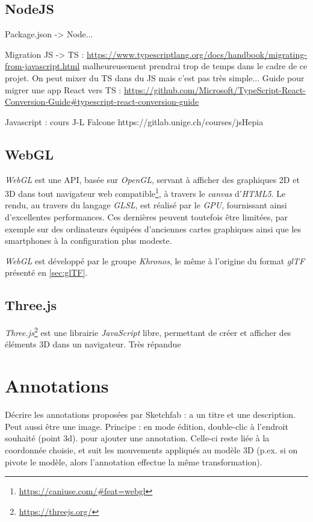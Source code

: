 \subsection{NodeJS}
Package.json -> Node...

Migration JS -> TS : \url{https://www.typescriptlang.org/docs/handbook/migrating-from-javascript.html}
malheureusement prendrai trop de temps dans le cadre de ce projet. On peut mixer du TS dans du JS mais c'est pas très simple...
Guide pour migrer une app React vers TS : \url{https://github.com/Microsoft/TypeScript-React-Conversion-Guide\#typescript-react-conversion-guide}

Javascript : cours J-L Falcone https://gitlab.unige.ch/courses/jsHepia

\subsection{WebGL}
\textit{WebGL} est une API, basée sur \textit{OpenGL}, servant à afficher des graphiques 2D et 3D dans tout navigateur web compatible\footnote{\url{https://caniuse.com/\#feat=webgl}}, à travers le \textit{canvas} d'\textit{HTML5}. 
Le rendu, au travers du langage \textit{GLSL}, est réalisé par le \textit{GPU}, fournissant ainsi d'excellentes performances. Ces dernières peuvent toutefois être limitées, par exemple sur des ordinateurs équipées d'anciennes cartes graphiques ainsi que les smartphones à la configuration plus modeste.

\textit{WebGL} est développé par le groupe \textit{Khronos}, le même à l'origine du format \textit{glTF} présenté en \ref{sec:glTF}.


\subsection{Three.js}
\textit{Three.js}\footnote{\url{https://threejs.org/}} est une librairie \textit{JavaScript} libre, permettant de créer et afficher des éléments 3D dans un navigateur. Très répandue




\section{Annotations}


Décrire les annotations proposées par Sketchfab : a un titre et une description. Peut aussi être une image.
Principe : en mode édition, double-clic à l'endroit souhaité (point 3d). pour ajouter une annotation. Celle-ci reste liée à la coordonnée choisie, et suit les mouvements appliqués au modèle 3D (p.ex. si on pivote le modèle, alors l'annotation effectue la même transformation).

